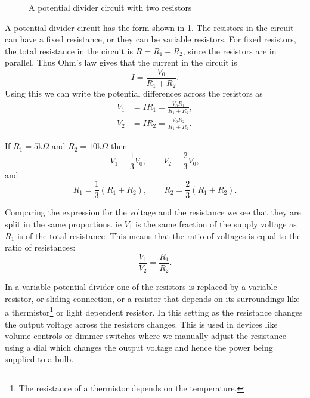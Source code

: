 \documentclass[a4paper,12pt]{book}
\begin{document}
  \begin{figure}[ht]
    \centering
    \caption{A potential divider circuit with two resistors}
    \label{fig: potential divider}
\end{figure}

A potential divider circuit has the form shown in \cref{fig: potential divider}. The resistors in the circuit can have a fixed resistance, or they can be variable resistors. For fixed resistors, the total resistance in the circuit is $R=R_{1}+R_{2}$, since the resistors are in parallel. Thus Ohm's law gives that the current in the circuit is
\begin{equation*}
I=\frac{V_{0}}{R_{1}+R_{2}}.
\end{equation*}
Using this we can write the potential differences across the resistors as
\begin{align*}
V_{1}&=IR_{1}=\frac{V_{0}R_{1}}{R_{1}+R_{2}},\\
V_{2}&=IR_{2}=\frac{V_{0}R_{2}}{R_{1}+R_{2}}.
\end{align*}

If $R_{1}=5\text{k}\Omega$ and $R_{2}=10\text{k}\Omega$ then
\begin{equation*}
V_{1}=\frac{1}{3}V_{0}, \qquad V_{2}=\frac{2}{3}V_{0},
\end{equation*}
and 
\begin{equation*}
R_{1}=\frac{1}{3}\left(R_{1}+R_{2}\right), \qquad R_{2}=\frac{2}{3}\left(R_{1}+R_{2}\right).
\end{equation*}

Comparing the expression for the voltage and the resistance we see that they are split in the same proportions. ie $V_{1}$ is the same fraction of the supply voltage as $R_{1}$ is of the total resistance. This means that the ratio of voltages is equal to the ratio of resistances:
\begin{equation}
\frac{V_{1}}{V_{2}}=\frac{R_{1}}{R_{2}}.
\label{eq: voltage ratios}
\end{equation}

In a variable potential divider one of the resistors is replaced by a variable resistor, or sliding connection, or a resistor that depends on its surroundings like a thermistor\footnote{The resistance of a thermistor depends on the temperature.} or  light dependent resistor. In this setting as the resistance changes the output voltage across the resistors changes. This is used in devices like volume controls or dimmer switches where we manually adjust the resistance using a dial which changes the output voltage and hence the power being supplied to a bulb.\\
\end{document}
